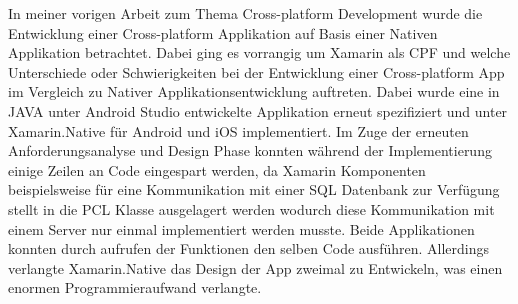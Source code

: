 In meiner vorigen Arbeit zum Thema Cross-platform Development \cite{Maximilian2017} wurde die Entwicklung einer Cross-platform Applikation auf Basis einer Nativen Applikation betrachtet. Dabei ging es vorrangig um Xamarin als CPF und welche Unterschiede oder Schwierigkeiten bei der Entwicklung einer Cross-platform App im Vergleich zu Nativer Applikationsentwicklung auftreten. Dabei wurde eine in JAVA unter Android Studio entwickelte Applikation erneut spezifiziert und unter Xamarin.Native für Android und iOS implementiert. Im Zuge der erneuten Anforderungsanalyse und Design Phase konnten während der Implementierung einige Zeilen an Code eingespart werden, da Xamarin Komponenten beispielsweise für eine Kommunikation mit einer SQL Datenbank zur Verfügung stellt in die PCL Klasse ausgelagert werden wodurch diese Kommunikation mit einem Server nur einmal implementiert werden musste. Beide Applikationen konnten durch aufrufen der Funktionen den selben Code ausführen. Allerdings verlangte Xamarin.Native das Design der App zweimal zu Entwickeln, was einen enormen Programmieraufwand verlangte.
